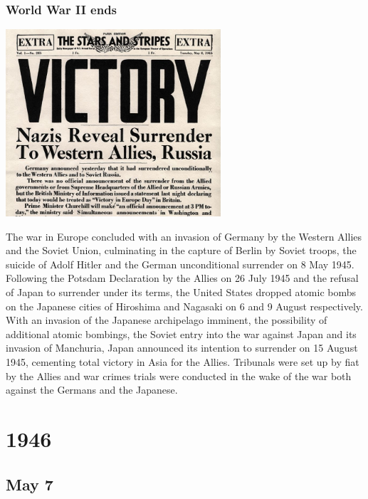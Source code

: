 \documentclass[11pt]{report}
\begin{document}
\subsection{World War II ends}
\vspace{2mm}\begin{center}\includegraphics[width=8cm]{./img/endww2.jpg}\end{center}
The war in Europe concluded with an invasion of Germany by the Western Allies and the Soviet Union, culminating in the capture of Berlin by Soviet troops, the suicide of Adolf Hitler and the German unconditional surrender on 8 May 1945. Following the Potsdam Declaration by the Allies on 26 July 1945 and the refusal of Japan to surrender under its terms, the United States dropped atomic bombs on the Japanese cities of Hiroshima and Nagasaki on 6 and 9 August respectively. With an invasion of the Japanese archipelago imminent, the possibility of additional atomic bombings, the Soviet entry into the war against Japan and its invasion of Manchuria, Japan announced its intention to surrender on 15 August 1945, cementing total victory in Asia for the Allies. Tribunals were set up by fiat by the Allies and war crimes trials were conducted in the wake of the war both against the Germans and the Japanese.

\chapter{1946}
\section{May 7}
\end{document}
